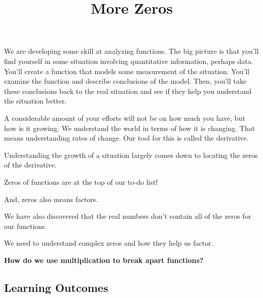 \documentclass{ximera}
\title{More Zeros}
\begin{document}
\begin{abstract}
%
\end{abstract}
\maketitle




We are developing some skill at analyzing functions.  The big picture is that you'll find yourself in some situation involving quantitative information, perhaps data.  You'll create a function that models some measurement of the situation.  You'll examine the function and describe conclusions of the model.  Then, you'll take these conclusions back to the real situation and see if they help you understand the situation better.




A considerable amount of your efforts will not be on how much you have, but how is it growing.  We understand the world in terms of how it is changing.  That means understanding rates of change.  Our tool for this is called the derivative.




Understanding the growth of a situation largely comes down to locating the zeros of the derivative.


Zeros of functions are at the top of our to-do list!  

And, zeros also means factors.  


We have also discovered that the real numbers don't contain all of the zeros for our functions.  


We need to understand complex zeros and how they help us factor.  


\begin{center}
\textbf{\textcolor{red!80!black}{How do we use multiplication to break apart functions?}}
\end{center} 





















\subsection*{Learning Outcomes}
\end{document}

